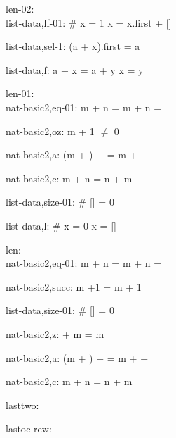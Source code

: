 \documentclass[a4paper]{article}
\begin{document}
\bigskip

len-02:\\ list-data,lf-01: 
 \Fol \# x = 1 \Equiv x = x.first + []



list-data,sel-1: 
 \Fol (a + x).first = a



list-data,f: 
 \Fol a + x = a + y \Equiv x = y



\bigskip

len-01:\\ nat-basic2,eq-01: 
 \Fol m + n = m +  \Equiv n = 



nat-basic2,oz: 
 \Fol m + 1 $\neq$ 0



nat-basic2,a: 
 \Fol (m + ) +  = m +  + 



nat-basic2,c: 
 \Fol m + n = n + m



list-data,size-01: 
 \Fol \# [] = 0



list-data,l: 
 \Fol \# x = 0 \Equiv x = []



\bigskip

len:\\ nat-basic2,eq-01: 
 \Fol m + n = m +  \Equiv n = 



nat-basic2,succ: 
 \Fol m +1 = m + 1



list-data,size-01: 
 \Fol \# [] = 0



nat-basic2,z: 
  + m = m



nat-basic2,a: 
 \Fol (m + ) +  = m +  + 



nat-basic2,c: 
 \Fol m + n = n + m



\bigskip

lasttwo:\\ 

\bigskip

lastoc-rew:\\ 

\bigskip
\end{document}
